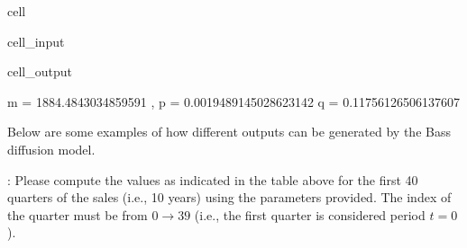 \documentclass[letterpaper,10pt,english]{jupyterBook}
\begin{document}
\begin{sphinxuseclass}{cell}\begin{sphinxVerbatimInput}

\begin{sphinxuseclass}{cell_input}
\begin{sphinxVerbatim}[commandchars=\\\{\}]
  
  
     
\end{sphinxVerbatim}

\end{sphinxuseclass}\end{sphinxVerbatimInput}
\begin{sphinxVerbatimOutput}

\begin{sphinxuseclass}{cell_output}
\begin{sphinxVerbatim}[commandchars=\\\{\}]
m =  1884.4843034859591 , p =  0.0019489145028623142 q =  0.11756126506137607
\end{sphinxVerbatim}

\end{sphinxuseclass}\end{sphinxVerbatimOutput}

\end{sphinxuseclass}
\sphinxAtStartPar
Below are some examples of how different outputs can be generated by the Bass diffusion model.

\sphinxAtStartPar
{}: Please compute the values as indicated in the table above for the first 40 quarters of the sales (i.e., 10 years) using the parameters provided. The index of the quarter must be from \(0 \rightarrow 39\) (i.e., the first quarter is considered period \(t=0\)).
\end{document}
